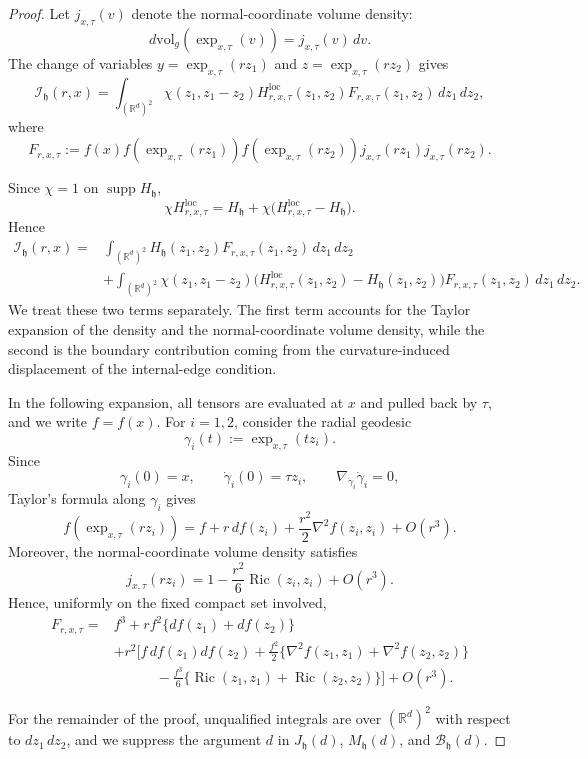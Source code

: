\documentclass[11pt]{article}
\theoremstyle{remark}
\newcommand{\R}{\mathbb R}
\newcommand{\Ric}{\operatorname{Ric}}
\numberwithin{equation}{section}
\begin{document}
\begin{proof}
Let \(j_{x,\tau}(v)\) denote the normal-coordinate volume density:
\[
d\mathrm{vol}_g(\exp_{x,\tau}(v))
=
j_{x,\tau}(v)\,dv.
\]
The change of variables
$y=\exp_{x,\tau}(rz_1)$ and $z=\exp_{x,\tau}(rz_2)$
gives
\[
\mathcal I_{\mathfrak h}(r,x)
=
\int_{(\R^d)^2}
\chi(z_1,z_1-z_2)
H^{\mathrm{loc}}_{r,x,\tau}(z_1,z_2)
F_{r,x,\tau}(z_1,z_2)
\,dz_1\,dz_2,
\]
where
\[
F_{r,x,\tau}
:=
f(x)
f(\exp_{x,\tau}(rz_1))
f(\exp_{x,\tau}(rz_2))
j_{x,\tau}(rz_1)
j_{x,\tau}(rz_2).
\]

Since \(\chi=1\) on \(\operatorname{supp}H_{\mathfrak h}\),
\[
\chi H^{\mathrm{loc}}_{r,x,\tau}
=
H_{\mathfrak h}
+
\chi
\bigl(
H^{\mathrm{loc}}_{r,x,\tau}
-
H_{\mathfrak h}
\bigr).
\]
Hence
\[
\begin{aligned}
\mathcal I_{\mathfrak h}(r,x)
={}&
\int_{(\R^d)^2}
H_{\mathfrak h}(z_1,z_2)
F_{r,x,\tau}(z_1,z_2)
\,dz_1\,dz_2\\
&+
\int_{(\R^d)^2}
\chi(z_1,z_1-z_2)
\bigl(
H^{\mathrm{loc}}_{r,x,\tau}(z_1,z_2)
-
H_{\mathfrak h}(z_1,z_2)
\bigr)
F_{r,x,\tau}(z_1,z_2)
\,dz_1\,dz_2.
\end{aligned}
\]
We treat these two terms separately.  The first term accounts for the
Taylor expansion of the density and the normal-coordinate volume density,
while the second is the boundary contribution coming from the
curvature-induced displacement of the internal-edge condition.

In the following expansion, all tensors are evaluated at \(x\) and pulled
back by \(\tau\), and we write \(f=f(x)\).
For \(i=1,2\), consider the radial geodesic
\[
\gamma_i(t):=\exp_{x,\tau}(t z_i).
\]
Since
\[
\gamma_i(0)=x,
\qquad
\dot\gamma_i(0)=\tau z_i,
\qquad
\nabla_{\dot\gamma_i}\dot\gamma_i=0,
\]
Taylor's formula along \(\gamma_i\) gives
\[
f(\exp_{x,\tau}(rz_i))
=
f
+
r\,df(z_i)
+
\frac{r^2}{2}\nabla^2f(z_i,z_i)
+
O(r^3).
\]
Moreover, the normal-coordinate volume density satisfies
\[
j_{x,\tau}(rz_i)
=
1-\frac{r^2}{6}\Ric(z_i,z_i)+O(r^3).
\]
Hence, uniformly on the fixed compact set involved,
\[
\begin{aligned}
F_{r,x,\tau}
={}&
f^3
+
r f^2\{df(z_1)+df(z_2)\}\\
&+
r^2\Bigg[
f\,df(z_1)df(z_2)
+
\frac{f^2}{2}
\{
\nabla^2f(z_1,z_1)
+
\nabla^2f(z_2,z_2)
\}\\
&\hspace{3em}
-
\frac{f^3}{6}
\{
\Ric(z_1,z_1)
+
\Ric(z_2,z_2)
\}
\Bigg]
+
O(r^3).
\end{aligned}
\]

For the remainder of the proof, unqualified integrals are over
\((\R^d)^2\) with respect to \(dz_1\,dz_2\), and we suppress the argument
\(d\) in \(J_{\mathfrak h}(d)\), \(M_{\mathfrak h}(d)\), and
\(\mathcal B_{\mathfrak h}(d)\).


\end{proof}
\end{document}
